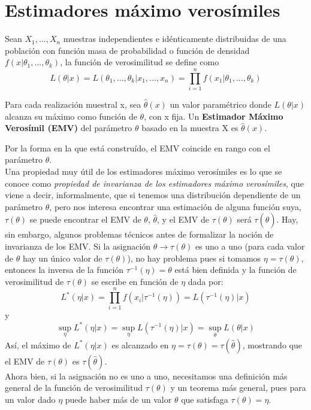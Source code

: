 \section{Estimadores máximo verosímiles}\label{st:emv}
Sean $X_{1},...,X_{n}$ muestras independientes e idénticamente distribuidas de una población con función masa de probabilidad o función de densidad $f(x \vert \theta_{1},...,\theta_{k})$, la función de verosimilitud se define como
\[ L(\theta \vert x)=L(\theta_{1},...,\theta_{k} \vert x_{1},...,x_{n})=\prod_{i=1}^{n} f(x_{1} \vert \theta_{1},...,\theta_{k}) \]
\begin{definicion}
Para cada realización muestral x, sea $\hat{\theta}(x)$ un valor paramétrico donde $L(\theta \vert x)$ alcanza su máximo como función de $\theta$, con x fija. Un \textbf{Estimador Máximo Verosímil (EMV)}  del parámetro $\theta$ basado en la muestra X es $\hat{\theta}(x)$. \cite{garthwaite2002statistical} \end{definicion}
Por la forma en la que está construído, el EMV coincide en rango con el parámetro $\theta$.\\
Una propiedad muy útil de los estimadores máximo verosímiles es lo que se conoce como \textit{propiedad de invarianza de los estimadores máximo verosímiles}, que viene a decir, informalmente, que si tenemos una distribución dependiente de un parámetro $\theta$, pero nos interesa encontrar una estimación de alguna función suya, $\tau(\theta)$ se puede encontrar el EMV de $\theta$, $\hat{\theta}$, y el EMV de $\tau(\theta)$ será $\tau(\hat{\theta})$. Hay, sin embargo, algunos problemas técnicos antes de formalizar la noción de invarianza de los EMV. Si la asignación $\theta \rightarrow \tau(\theta)$ es uno a uno (para cada valor de $\theta$ hay un único valor de $\tau(\theta)$), no hay problema pues si tomamos $\eta = \tau(\theta)$, entonces la inversa de la función $\tau^{-1}(\eta)=\theta$ está bien definida y la función de verosimilitud de $\tau(\theta)$ se escribe en función de $\eta$ dada por: \[ L^{*}(\eta \vert x) = \prod_{i=1}^{n}f(x_{i} \vert \tau^{-1}(\eta)) = L(\tau^{-1}(\eta) \vert x) \]
y
\[ \sup_{\eta}L^{*}(\eta \vert x) = \sup_{\eta}L(\tau^{-1}(\eta) \vert x) = \sup_{\theta}L(\theta \vert x) \]
Así, el máximo de $L^{*}(\eta \vert x) $ es alcanzado en $\eta = \tau(\theta) = \tau(\hat{\theta})$, mostrando que el EMV de $\tau(\theta)$ es $\tau(\hat{\theta})$.\\
Ahora bien, si la asignación no es uno a uno, necesitamos una definición más general de  la función de verosimilitud $\tau(\theta)$ y un teorema más general, pues para un valor dado $\eta$ puede haber más de un valor $\theta$ que satisfaga $\tau(\theta) = \eta$.\\
